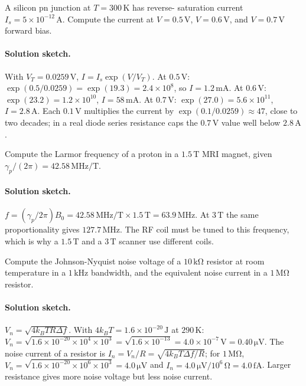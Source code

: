\begin{exercise}
A silicon pn junction at $T = 300\,\si{\kelvin}$ has reverse-
saturation current $I_{s} = 5\times 10^{-12}\,\si{\ampere}$. Compute
the current at $V = 0.5\,\si{\volt}$, $V = 0.6\,\si{\volt}$, and
$V = 0.7\,\si{\volt}$ forward bias.
\paragraph{Solution sketch.} With $V_{T} = 0.0259\,\si{\volt}$,
$I = I_{s}\exp(V/V_{T})$. At $0.5\,\si{\volt}$: $\exp(0.5/0.0259) =
\exp(19.3) = 2.4\times 10^{8}$, so $I = 1.2\,\si{\milli\ampere}$. At
$0.6\,\si{\volt}$: $\exp(23.2) = 1.2\times 10^{10}$, $I = 58\,\si{\milli
\ampere}$. At $0.7\,\si{\volt}$: $\exp(27.0) = 5.6\times 10^{11}$,
$I = 2.8\,\si{\ampere}$. Each $0.1\,\si{\volt}$ multiplies the current
by $\exp(0.1/0.0259) \approx 47$, close to two decades; in a real diode
series resistance caps the $0.7\,\si{\volt}$ value well below
$2.8\,\si{\ampere}$.
\end{exercise}

\begin{exercise}
Compute the Larmor frequency of a proton in a $1.5\,\si{\tesla}$ MRI
magnet, given $\gamma_{p}/(2\pi) = 42.58\,\si{\mega\hertz\per\tesla}$.
\paragraph{Solution sketch.} $f = (\gamma_{p}/2\pi)B_{0} = 42.58\,\si{
\mega\hertz\per\tesla}\times 1.5\,\si{\tesla} = 63.9\,\si{\mega\hertz}$.
At $3\,\si{\tesla}$ the same proportionality gives $127.7\,\si{\mega
\hertz}$. The RF coil must be tuned to this frequency, which is why a
$1.5\,\si{\tesla}$ and a $3\,\si{\tesla}$ scanner use different coils.
\end{exercise}

\begin{exercise}
Compute the Johnson-Nyquist noise voltage of a $10\,\si{\kilo\ohm}$
resistor at room temperature in a $1\,\si{\kilo\hertz}$ bandwidth, and
the equivalent noise current in a $1\,\si{\mega\ohm}$ resistor.
\paragraph{Solution sketch.} $V_{n} = \sqrt{4k_{B}TR\Delta f}$. With
$4k_{B}T = 1.6\times 10^{-20}\,\si{\joule}$ at $290\,\si{\kelvin}$:
$V_{n} = \sqrt{1.6\times 10^{-20}\times 10^{4}\times 10^{3}} = \sqrt{1.6
\times 10^{-13}} = 4.0\times 10^{-7}\,\si{\volt} = 0.40\,\si{\micro
\volt}$. The noise current of a resistor is $I_{n} = V_{n}/R = \sqrt{4
k_{B}T\Delta f/R}$; for $1\,\si{\mega\ohm}$, $V_{n} = \sqrt{1.6\times
10^{-20}\times 10^{6}\times 10^{3}} = 4.0\,\si{\micro\volt}$ and
$I_{n} = 4.0\,\si{\micro\volt}/10^{6}\,\si{\ohm} = 4.0\,\si{\femto
\ampere}$. Larger resistance gives more noise voltage but less noise
current.
\end{exercise}

